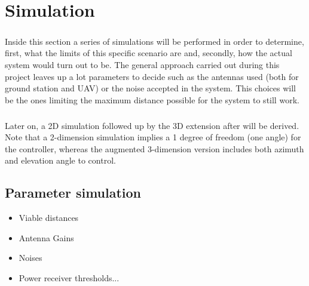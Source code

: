 \chapter{Simulation}\label{ch:sim}

\paragraph{} Inside this section a series of simulations will be performed in order to determine, first, what the limits of this specific scenario are and, secondly, how the actual system would turn out to be.
The general approach carried out during this project leaves up a lot parameters to decide such as the antennas used (both for ground station and UAV) or the noise accepted in the system. This choices will be the ones limiting the maximum distance possible for the system to still work.

\paragraph{} Later on, a 2D simulation followed up by the 3D extension after will be derived. Note that a 2-dimension simulation implies a 1 degree of freedom (one angle) for the controller, whereas the augmented 3-dimension version includes both azimuth and elevation angle to control.
\section{Parameter simulation}
\begin{itemize}
\item{Viable distances}
\item{Antenna Gains}
\item{Noises}
\item{Power receiver thresholds...}
\end{itemize}
